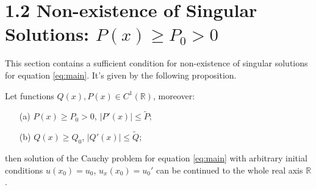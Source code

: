 \section*{1.2 Non-existence of Singular Solutions: $P(x) \ge P_0 > 0$}

This section contains a sufficient condition for non-existence of singular solutions for equation \eqref{eq:main}.
It's given by the following proposition.

\begin{proposition}
	Let functions $Q(x), P(x) \in C^1(\mathbb{R})$, moreover:
	\begin{enumerate}
		\item[(a)] $P(x) \ge P_0 > 0$, $|P'(x)| \le \widetilde{P}$;
		\item[(b)] $Q(x) \ge Q_0$, $|Q'(x)| \le \widetilde{Q}$;
	\end{enumerate}
	then solution of the Cauchy problem for equation \eqref{eq:main} with arbitrary initial conditions $u(x_0) = u_0$, $u_{x}(x_0) = u_0'$ can be continued to the whole real axis $\mathbb{R}$.
	\label{prop:absense-of-singular-solutions}
\end{proposition}
